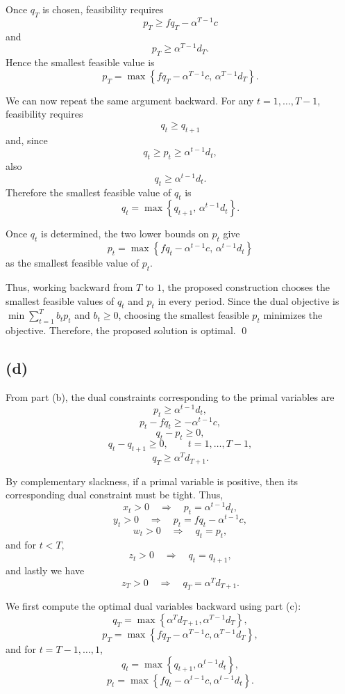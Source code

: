 \documentclass{article}
\begin{document}
Once $q_T$ is chosen, feasibility requires
\[
p_T\geq fq_T-\alpha^{T-1}c
\]
and
\[
p_T\geq\alpha^{T-1}d_T.
\]
Hence the smallest feasible value is
\[
p_T=
\max\left\{
fq_T-\alpha^{T-1}c,\,
\alpha^{T-1}d_T
\right\}.
\]

We can now repeat the same argument backward. For any
$t=1,\ldots,T-1$, feasibility requires
\[
q_t\geq q_{t+1}
\]
and, since
\[
q_t\geq p_t\geq\alpha^{t-1}d_t,
\]
also
\[
q_t\geq\alpha^{t-1}d_t.
\]
Therefore the smallest feasible value of $q_t$ is
\[
q_t=
\max\left\{
q_{t+1},\,
\alpha^{t-1}d_t
\right\}.
\]

Once $q_t$ is determined, the two lower bounds on $p_t$ give
\[
p_t=
\max\left\{
fq_t-\alpha^{t-1}c,\,
\alpha^{t-1}d_t
\right\}
\]
as the smallest feasible value of $p_t$.

Thus, working backward from $T$ to $1$, the proposed construction
chooses the smallest feasible values of $q_t$ and $p_t$ in every
period. Since the dual objective is
$
\min \sum_{t=1}^T b_t p_t
$
and $b_t\geq0$, choosing the smallest feasible $p_t$ minimizes the
objective. Therefore, the proposed solution is optimal. \qed






\vspace{5mm}
\subsection*{(d)}


From part (b), the dual constraints corresponding to the primal variables are
\[
p_t\geq \alpha^{t-1}d_t,
\]
\[
p_t-fq_t\geq -\alpha^{t-1}c,
\]
\[
q_t-p_t\geq 0,
\]
\[
q_t-q_{t+1}\geq 0,
\qquad t=1,\ldots,T-1,
\]
\[
q_T\geq \alpha^T d_{T+1}.
\]

By complementary slackness, if a primal variable is positive, then its
corresponding dual constraint must be tight. Thus,
\[
x_t>0
\quad\Rightarrow\quad
p_t=\alpha^{t-1}d_t,
\]
\[
y_t>0
\quad\Rightarrow\quad
p_t=fq_t-\alpha^{t-1}c,
\]
\[
w_t>0
\quad\Rightarrow\quad
q_t=p_t,
\]
and for $t<T$,
\[
z_t>0
\quad\Rightarrow\quad
q_t=q_{t+1},
\]
and lastly we have
\[
z_T>0
\quad\Rightarrow\quad
q_T=\alpha^T d_{T+1}.
\]

We first compute the optimal dual variables backward using part (c):
\[
q_T=\max\left\{\alpha^T d_{T+1},\alpha^{T-1}d_T\right\},
\]
\[
p_T=\max\left\{fq_T-\alpha^{T-1}c,\alpha^{T-1}d_T\right\},
\]
and for $t=T-1,\ldots,1$,
\[
q_t=\max\left\{q_{t+1},\alpha^{t-1}d_t\right\},
\]
\[
p_t=\max\left\{fq_t-\alpha^{t-1}c,\alpha^{t-1}d_t\right\}.
\]
\end{document}
